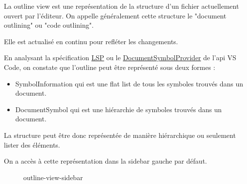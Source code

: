 \documentclass[
    iict, %
    il, %
]{heig-tb}
\begin{document}
La outline view est une représentation de la structure d'un fichier actuellement ouvert par l'éditeur. On appelle généralement cette structure le "document outlining" ou "code outlining".

Elle est actualisé en continu pour refléter les changements.

En analysant la spécification \href{https://microsoft.github.io/language-server-protocol/specifications/lsp/3.17/specification/}{LSP} ou le \href{https://code.visualstudio.com/api/references/vscode-api#DocumentSymbol}{DocumentSymbolProvider} de l'api VS Code, on constate que l'outline peut être représenté sous deux formes :

\begin{itemize}
    \item SymbolInformation qui est une flat list de tous les symboles trouvés dans un document.
    \item DocumentSymbol qui est une hiérarchie de symboles trouvés dans un document.
\end{itemize}

La structure peut être donc représentée de manière hiérarchique ou seulement lister des éléments.

On a accès à cette représentation dans la sidebar gauche par défaut.

\begin{figure}[!h]
    \begin{center}
    \end{center}
    \caption[Outline view disponible depuis la sidebar]{\label{outline-view-sidebar} outline-view-sidebar}
\end{figure}
\end{document}
